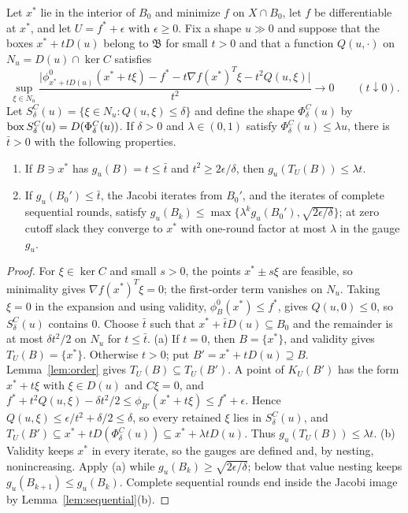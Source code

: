 \begin{proposition}\label{prop:restricted-tangent-con}
Let $x^*$ lie in the interior of $B_0$ and minimize $f$ on $X\cap B_0$,
let $f$ be differentiable at $x^*$, and let $U=f^*+\epsilon$ with
$\epsilon\ge0$. Fix a shape $u\gg0$ and suppose
that the boxes $x^*+tD(u)$ belong to $\mathfrak B$ for small $t>0$ and
that a function $Q(u,\cdot)$ on $N_u=D(u)\cap\ker C$ satisfies
\[
 \sup_{\xi\in N_u}\frac{\bigl|\phi^0_{x^*+tD(u)}(x^*+t\xi)-f^*
  -t\nabla f(x^*)^T\xi-t^2Q(u,\xi)\bigr|}{t^2}\longrightarrow0
 \qquad(t\downarrow0).
\]
Let $S^C_\delta(u)=\{\xi\in N_u:Q(u,\xi)\le\delta\}$ and define the shape
$\Phi^C_\delta(u)$ by $\operatorname{box} S^C_\delta(u)=D(\Phi^C_\delta(u))$. If
$\delta>0$ and $\lambda\in(0,1)$ satisfy $\Phi^C_\delta(u)\le\lambda u$,
there is $\bar t>0$ with the following properties.
\begin{enumerate}
\item[(a)] If $B\ni x^*$ has $g_u(B)=t\le\bar t$ and
 $t^2\ge2\epsilon/\delta$, then $g_u(T_U(B))\le\lambda t$.
\item[(b)] If $g_u(B_0')\le\bar t$, the Jacobi iterates from $B_0'$, and the
 iterates of complete sequential rounds, satisfy
 $g_u(B_k)\le\max\{\lambda^kg_u(B_0'),\sqrt{2\epsilon/\delta}\}$; at zero
 cutoff slack they converge to $x^*$ with one-round factor at most
 $\lambda$ in the gauge $g_u$.
\end{enumerate}
\end{proposition}

\begin{proof}
For $\xi\in\ker C$ and small $s>0$, the points $x^*\pm s\xi$ are feasible,
so minimality gives $\nabla f(x^*)^T\xi=0$; the first-order term vanishes
on $N_u$. Taking $\xi=0$ in the expansion and using validity,
$\phi^0_B(x^*)\le f^*$, gives $Q(u,0)\le0$, so $S^C_\delta(u)$ contains
$0$. Choose $\bar t$ such that $x^*+\bar tD(u)\subseteq B_0$ and the
remainder is at most $\delta t^2/2$ on $N_u$ for $t\le\bar t$.
(a) If $t=0$, then $B=\{x^*\}$, and validity gives $T_U(B)=\{x^*\}$.
Otherwise $t>0$; put $B'=x^*+tD(u)\supseteq B$. Lemma~\ref{lem:order} gives
$T_U(B)\subseteq T_U(B')$. A point of $K_U(B')$ has the form $x^*+t\xi$
with $\xi\in D(u)$ and $C\xi=0$, and
$f^*+t^2Q(u,\xi)-\delta t^2/2\le\phi_{B'}(x^*+t\xi)\le f^*+\epsilon$.
Hence $Q(u,\xi)\le\epsilon/t^2+\delta/2\le\delta$, so every retained
$\xi$ lies in $S^C_\delta(u)$, and
$T_U(B')\subseteq x^*+tD(\Phi^C_\delta(u))\subseteq x^*+\lambda tD(u)$.
Thus $g_u(T_U(B))\le\lambda t$. (b) Validity keeps $x^*$ in every iterate,
so the gauges are defined and, by nesting, nonincreasing. Apply (a) while
$g_u(B_k)\ge\sqrt{2\epsilon/\delta}$; below that value nesting keeps
$g_u(B_{k+1})\le g_u(B_k)$. Complete sequential rounds end inside the
Jacobi image by Lemma~\ref{lem:sequential}(b).
\end{proof}


